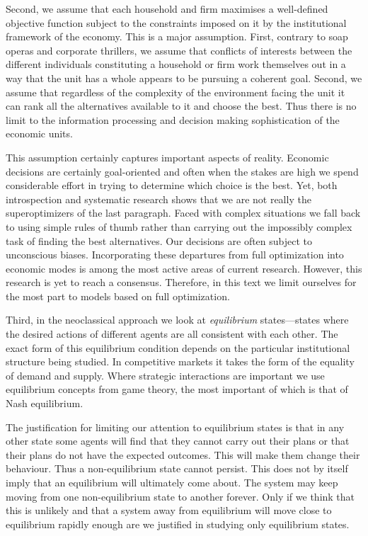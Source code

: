 \documentclass[11pt,reqno,openany]{amsbook}
\begin{document}
Second, we assume that each household and firm maximises a
well-defined objective function subject to the constraints
imposed on it by the institutional framework of the economy.
This is a major assumption. First, contrary to soap operas
and corporate thrillers, we assume that conflicts of
interests between the different individuals constituting a
household or firm work themselves out in a way that the unit
has a whole appears to be pursuing a coherent goal. Second,
we assume that regardless of the complexity of the
environment facing the unit it can rank all the alternatives
available to it and choose the best. Thus there is no limit
to the information processing and decision making
sophistication of the economic units.

This assumption certainly captures important aspects of
reality. Economic decisions are certainly goal-oriented and
often when the stakes are high we spend considerable effort
in trying to determine which choice is the best. Yet, both
introspection and systematic research shows that we are not
really the superoptimizers of the last paragraph. Faced with
complex situations we fall back to using simple rules of
thumb rather than carrying out the impossibly complex task
of finding the best alternatives. Our decisions are often
subject to unconscious biases. Incorporating these
departures from full optimization into economic modes is
among the most active areas of current research. However,
this research is yet to reach a consensus. Therefore, in
this text we limit ourselves for the most part to models
based on full optimization.

Third, in the neoclassical approach we look at
\emph{equilibrium} states---states where the desired actions
of different agents are all consistent with each other. The
exact form of this equilibrium condition depends on the
particular institutional structure being studied. In
competitive markets it takes the form of the equality of
demand and supply. Where strategic interactions are
important we use equilibrium concepts from game theory, the
most important of which is that of Nash equilibrium.

The justification for limiting our attention to equilibrium
states is that in any other state some agents will find that
they cannot carry out their plans or that their plans do not
have the expected outcomes. This will make them change their
behaviour. Thus a non-equilibrium state cannot persist.
This does not by itself imply that an equilibrium will
ultimately come about. The system may keep moving from one
non-equilibrium state to another forever. Only if we think
that this is unlikely and that a system away from
equilibrium will move close to equilibrium rapidly enough
are we justified in studying only equilibrium states.
\end{document}
